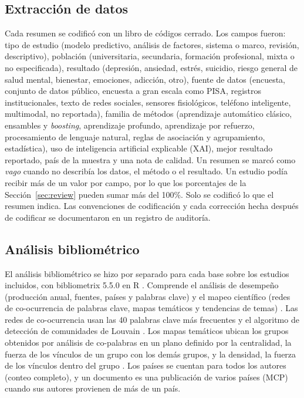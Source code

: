 \documentclass[11pt,a4paper]{article}
\begin{document}
\subsection{Extracción de datos}

Cada resumen se codificó con un libro de códigos cerrado. Los campos fueron: tipo de estudio (modelo predictivo, análisis de factores, sistema o marco, revisión, descriptivo), población (universitaria, secundaria, formación profesional, mixta o no especificada), resultado (depresión, ansiedad, estrés, suicidio, riesgo general de salud mental, bienestar, emociones, adicción, otro), fuente de datos (encuesta, conjunto de datos público, encuesta a gran escala como PISA, registros institucionales, texto de redes sociales, sensores fisiológicos, teléfono inteligente, multimodal, no reportada), familia de métodos (aprendizaje automático clásico, ensambles y \emph{boosting}, aprendizaje profundo, aprendizaje por refuerzo, procesamiento de lenguaje natural, reglas de asociación y agrupamiento, estadística), uso de inteligencia artificial explicable (XAI), mejor resultado reportado, país de la muestra y una nota de calidad. Un resumen se marcó como \emph{vago} cuando no describía los datos, el método o el resultado. Un estudio podía recibir más de un valor por campo, por lo que los porcentajes de la Sección~\ref{sec:review} pueden sumar más del 100\%. Solo se codificó lo que el resumen indica. Las convenciones de codificación y cada corrección hecha después de codificar se documentaron en un registro de auditoría.

\subsection{Análisis bibliométrico}

El análisis bibliométrico se hizo por separado para cada base sobre los estudios incluidos, con bibliometrix 5.5.0 en R \cite{aria2017bibliometrix}. Comprende el análisis de desempeño (producción anual, fuentes, países y palabras clave) y el mapeo científico (redes de co-ocurrencia de palabras clave, mapas temáticos y tendencias de temas) \cite{donthu2021bibliometric}. Las redes de co-ocurrencia usan las 40 palabras clave más frecuentes y el algoritmo de detección de comunidades de Louvain \cite{blondel2008louvain}. Los mapas temáticos ubican los grupos obtenidos por análisis de co-palabras \cite{callon1991coword} en un plano definido por la centralidad, la fuerza de los vínculos de un grupo con los demás grupos, y la densidad, la fuerza de los vínculos dentro del grupo \cite{cobo2011thematic}. Los países se cuentan para todos los autores (conteo completo), y un documento es una publicación de varios países (MCP) cuando sus autores provienen de más de un país.
\end{document}
